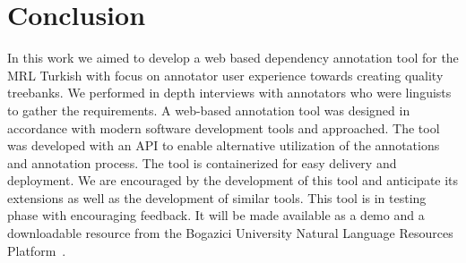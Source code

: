 \section{Conclusion}
\label{sec:conclusion}

In this work we aimed to develop a web based dependency annotation tool for the MRL Turkish with focus on annotator user experience towards creating quality treebanks. 
We performed in depth interviews with annotators who were linguists to gather the requirements. 
A web-based annotation tool was designed in accordance with modern software development tools and approached. 
The tool was developed with an API to enable alternative utilization of the annotations and annotation process. 
The tool is containerized for easy delivery and deployment. 
We are encouraged by the development of this tool and anticipate its extensions as well as the development of similar tools. 
This tool is in testing phase with encouraging feedback. It will be made available as a demo and a downloadable resource from 
the Bogazici University Natural Language Resources Platform~\cite{DIP}.
